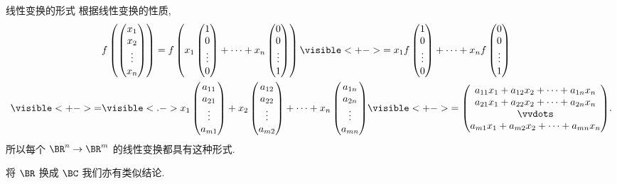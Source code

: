 \begin{frame}{线性变换的形式\noexer}
	\onslide<+->
	根据线性变换的性质,
	\begin{align*}
		&f\left(\begin{pmatrix}
			x_1\\x_2\\\vdots\\x_n
		\end{pmatrix}\right)
		=f\left(x_1\begin{pmatrix}
			1\\0\\\vdots\\0
		\end{pmatrix}+\dots+x_n\begin{pmatrix}
			0\\0\\\vdots\\1
		\end{pmatrix}\right)
		\visible<+->{=x_1f\begin{pmatrix}
			1\\0\\\vdots\\0
		\end{pmatrix}+\dots+x_nf\begin{pmatrix}
			0\\0\\\vdots\\1
		\end{pmatrix}}\\
		\visible<+->{=}&\visible<.->{x_1\begin{pmatrix}
			a_{11}\\a_{21}\\\vdots\\a_{m1}
		\end{pmatrix}+x_2\begin{pmatrix}
			a_{12}\\a_{22}\\\vdots\\a_{m2}
		\end{pmatrix}+\dots+x_n\begin{pmatrix}
			a_{1n}\\a_{2n}\\\vdots\\a_{mn}
		\end{pmatrix}}
		\visible<+->{=\begin{pmatrix}
			a_{11}x_1+a_{12}x_2+\cdots+a_{1n}x_n\\
			a_{21}x_1+a_{22}x_2+\cdots+a_{2n}x_n\\
			\vvdots\\
			a_{m1}x_1+a_{m2}x_2+\cdots+a_{mn}x_n
		\end{pmatrix}}.
	\end{align*}
	\onslide<+->
	所以每个 $\BR^n\to\BR^m$ 的线性变换都具有这种形式.

	\onslide<+->
	将 $\BR$ 换成 $\BC$ 我们亦有类似结论.
\end{frame}


